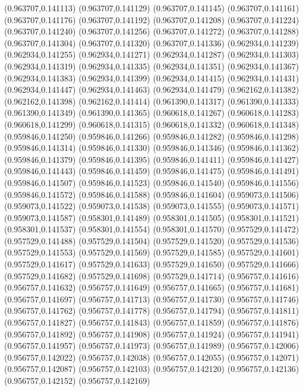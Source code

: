 (0.963707,0.141113)
(0.963707,0.141129)
(0.963707,0.141145)
(0.963707,0.141161)
(0.963707,0.141176)
(0.963707,0.141192)
(0.963707,0.141208)
(0.963707,0.141224)
(0.963707,0.141240)
(0.963707,0.141256)
(0.963707,0.141272)
(0.963707,0.141288)
(0.963707,0.141304)
(0.963707,0.141320)
(0.963707,0.141336)
(0.962934,0.141239)
(0.962934,0.141255)
(0.962934,0.141271)
(0.962934,0.141287)
(0.962934,0.141303)
(0.962934,0.141319)
(0.962934,0.141335)
(0.962934,0.141351)
(0.962934,0.141367)
(0.962934,0.141383)
(0.962934,0.141399)
(0.962934,0.141415)
(0.962934,0.141431)
(0.962934,0.141447)
(0.962934,0.141463)
(0.962934,0.141479)
(0.962162,0.141382)
(0.962162,0.141398)
(0.962162,0.141414)
(0.961390,0.141317)
(0.961390,0.141333)
(0.961390,0.141349)
(0.961390,0.141365)
(0.960618,0.141267)
(0.960618,0.141283)
(0.960618,0.141299)
(0.960618,0.141315)
(0.960618,0.141332)
(0.960618,0.141348)
(0.959846,0.141250)
(0.959846,0.141266)
(0.959846,0.141282)
(0.959846,0.141298)
(0.959846,0.141314)
(0.959846,0.141330)
(0.959846,0.141346)
(0.959846,0.141362)
(0.959846,0.141379)
(0.959846,0.141395)
(0.959846,0.141411)
(0.959846,0.141427)
(0.959846,0.141443)
(0.959846,0.141459)
(0.959846,0.141475)
(0.959846,0.141491)
(0.959846,0.141507)
(0.959846,0.141523)
(0.959846,0.141540)
(0.959846,0.141556)
(0.959846,0.141572)
(0.959846,0.141588)
(0.959846,0.141604)
(0.959073,0.141506)
(0.959073,0.141522)
(0.959073,0.141538)
(0.959073,0.141555)
(0.959073,0.141571)
(0.959073,0.141587)
(0.958301,0.141489)
(0.958301,0.141505)
(0.958301,0.141521)
(0.958301,0.141537)
(0.958301,0.141554)
(0.958301,0.141570)
(0.957529,0.141472)
(0.957529,0.141488)
(0.957529,0.141504)
(0.957529,0.141520)
(0.957529,0.141536)
(0.957529,0.141553)
(0.957529,0.141569)
(0.957529,0.141585)
(0.957529,0.141601)
(0.957529,0.141617)
(0.957529,0.141633)
(0.957529,0.141650)
(0.957529,0.141666)
(0.957529,0.141682)
(0.957529,0.141698)
(0.957529,0.141714)
(0.956757,0.141616)
(0.956757,0.141632)
(0.956757,0.141649)
(0.956757,0.141665)
(0.956757,0.141681)
(0.956757,0.141697)
(0.956757,0.141713)
(0.956757,0.141730)
(0.956757,0.141746)
(0.956757,0.141762)
(0.956757,0.141778)
(0.956757,0.141794)
(0.956757,0.141811)
(0.956757,0.141827)
(0.956757,0.141843)
(0.956757,0.141859)
(0.956757,0.141876)
(0.956757,0.141892)
(0.956757,0.141908)
(0.956757,0.141924)
(0.956757,0.141941)
(0.956757,0.141957)
(0.956757,0.141973)
(0.956757,0.141989)
(0.956757,0.142006)
(0.956757,0.142022)
(0.956757,0.142038)
(0.956757,0.142055)
(0.956757,0.142071)
(0.956757,0.142087)
(0.956757,0.142103)
(0.956757,0.142120)
(0.956757,0.142136)
(0.956757,0.142152)
(0.956757,0.142169)
